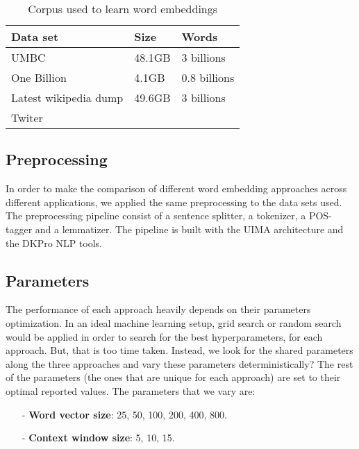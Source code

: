 \documentclass[11pt]{article}
\begin{document}
\begin{table}[h]
\begin{center}
\begin{small}
\begin{tabular}{lll}
\hline
\textbf{Data set} & \textbf{Size} & \textbf{Words} \\ \hline
UMBC 	& 48.1GB & 3 billions \\
One Billion 	& 4.1GB & 0.8 billions  \\
Latest wikipedia dump & 49.6GB & 3 billions \\
Twiter & &  \\ \hline
\end{tabular}
\end{small}
\label{corpus}
\caption{Corpus used to learn word embeddings}
\end{center}
\end{table}

\subsection{Preprocessing}

In order to make the comparison of different word embedding approaches across different applications, we applied the same preprocessing to the data sets used. 
The preprocessing pipeline consist of a sentence splitter, a tokenizer, a POS-tagger and a lemmatizer. The pipeline is built with the UIMA architecture and the DKPro NLP tools. 


\subsection{Parameters}

The performance of each approach heavily depends on their parameters optimization.
In an ideal machine learning setup, grid search or random search would be applied in order to search for the best hyperparameters, for each approach.
But, that is too time taken. Instead, we look for the shared parameters along the three approaches and vary these parameters deterministically? 
The rest of the parameters (the ones that are unique for each approach) are set to  their optimal reported values.
The parameters that we vary are:


\begin{small}
\begin{itemize}
\item[-]\textbf{Word vector size}: 25, 50, 100, 200, 400, 800.
\item[-]\textbf{Context window size}: 5, 10, 15.
\end{itemize}
\end{small}
\end{document}
